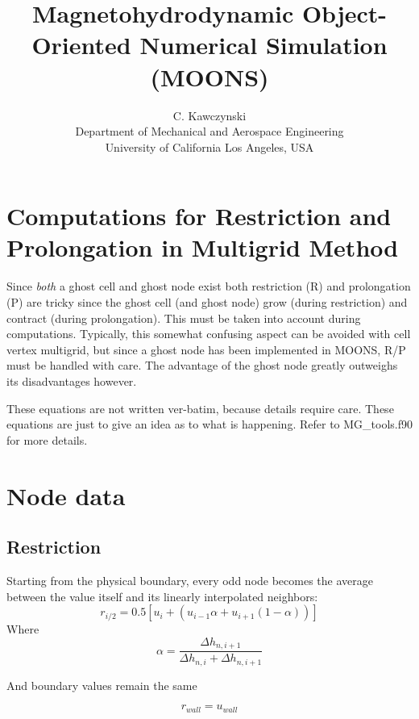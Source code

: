 \documentclass[11pt]{article}
\begin{document}
\doublespacing
\title{Magnetohydrodynamic Object-Oriented Numerical Simulation (MOONS)}
\author{C. Kawczynski \\
Department of Mechanical and Aerospace Engineering \\
University of California Los Angeles, USA\\
}
\maketitle

\section{Computations for Restriction and Prolongation in Multigrid Method}
Since \textit{both} a ghost cell and ghost node exist both restriction (R) and prolongation (P) are tricky since the ghost cell (and ghost node) grow (during restriction) and contract (during prolongation). This must be taken into account during computations. Typically, this somewhat confusing aspect can be avoided with cell vertex multigrid, but since a ghost node has been implemented in MOONS, R/P must be handled with care. The advantage of the ghost node greatly outweighs its disadvantages however.

These equations are not written ver-batim, because details require care. These equations are just to give an idea as to what is happening. Refer to MG\_tools.f90 for more details.

\section{Node data}

\subsection{Restriction}
Starting from the physical boundary, every odd node becomes the average between the value itself and its linearly interpolated neighbors:
\begin{equation}
	r_{i/2} = 0.5 \left[ u_i + (u_{i-1}\alpha + u_{i+1}(1-\alpha)) \right]
\end{equation}
Where
\begin{equation}
	\alpha = \frac{\Delta h_{n,i+1}}{\Delta h_{n,i} + \Delta h_{n,i+1}}
\end{equation}

And boundary values remain the same

\begin{equation}
	r_{wall} = u_{wall}
\end{equation}
\end{document}

